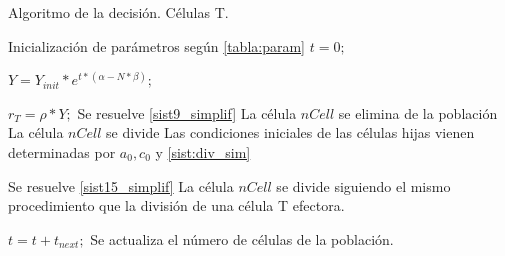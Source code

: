 \begin{algorithm}
	\caption{Algoritmo de la decisión. Células T.}
	\label{algo:pseudocodigo}
	\begin{algorithmic}[1]
		
		
		\State Inicialización de parámetros según \ref{tabla:param}
		\State $t = 0;$ 
		
		  
		\State $Y = Y_{init}*e^{t*(\alpha - N*\beta)};$ 
		
		 
			\State $ r_{T}=\rho*Y;$ 
			 
				\State Se resuelve \ref{sist9_simplif}
					\State La célula $nCell$ se elimina de la población
					\State La célula $nCell$ se divide
					\State Las condiciones iniciales de las células hijas vienen determinadas por $a_0, c_0$ y \ref{sist:div_sim}
				\EndIf
			
			 
				\State Se resuelve \ref{sist15_simplif}
					\State La célula $nCell$ se divide siguiendo el mismo procedimiento que la división de una célula T efectora. 
				\EndIf
			\EndIf
		\EndFor
		
		\State $t = t + t_{next};$
		\State Se actualiza el número de células de la población.	
		
		\EndWhile
		
	\end{algorithmic}
\end{algorithm}

